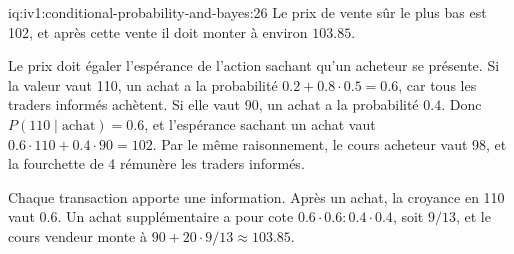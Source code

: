 \begin{solution}{iq:iv1:conditional-probability-and-bayes:26}
Le prix de vente sûr le plus bas est 102, et après cette vente il doit monter à environ $103.85$.

Le prix doit égaler l'espérance de l'action sachant qu'un acheteur se présente. Si la valeur vaut 110, un achat a la probabilité $0.2 + 0.8 \cdot 0.5 = 0.6$, car tous les traders informés achètent. Si elle vaut 90, un achat a la probabilité $0.4$. Donc $P(110 \mid \text{achat}) = 0.6$, et l'espérance sachant un achat vaut $0.6 \cdot 110 + 0.4 \cdot 90 = 102$. Par le même raisonnement, le cours acheteur vaut 98, et la fourchette de 4 rémunère les traders informés.

Chaque transaction apporte une information. Après un achat, la croyance en 110 vaut $0.6$. Un achat supplémentaire a pour cote $0.6 \cdot 0.6 : 0.4 \cdot 0.4$, soit $9/13$, et le cours vendeur monte à $90 + 20 \cdot 9/13 \approx 103.85$.

\end{solution}

